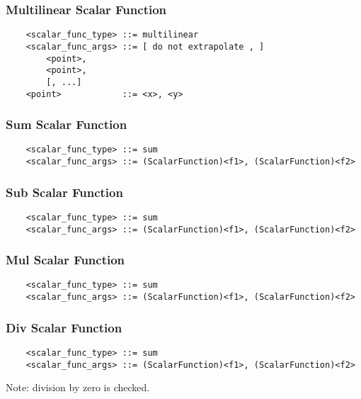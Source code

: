 \subsubsection{Multilinear Scalar Function}
\begin{verbatim}
    <scalar_func_type> ::= multilinear
    <scalar_func_args> ::= [ do not extrapolate , ]
        <point>, 
        <point>, 
        [, ...]
    <point>            ::= <x>, <y>
\end{verbatim}

\subsubsection{Sum Scalar Function}
\begin{verbatim}
    <scalar_func_type> ::= sum
    <scalar_func_args> ::= (ScalarFunction)<f1>, (ScalarFunction)<f2>
\end{verbatim}

\subsubsection{Sub Scalar Function}
\begin{verbatim}
    <scalar_func_type> ::= sum
    <scalar_func_args> ::= (ScalarFunction)<f1>, (ScalarFunction)<f2>
\end{verbatim}

\subsubsection{Mul Scalar Function}
\begin{verbatim}
    <scalar_func_type> ::= sum
    <scalar_func_args> ::= (ScalarFunction)<f1>, (ScalarFunction)<f2>
\end{verbatim}

\subsubsection{Div Scalar Function}
\begin{verbatim}
    <scalar_func_type> ::= sum
    <scalar_func_args> ::= (ScalarFunction)<f1>, (ScalarFunction)<f2>
\end{verbatim}
Note: division by zero is checked.

